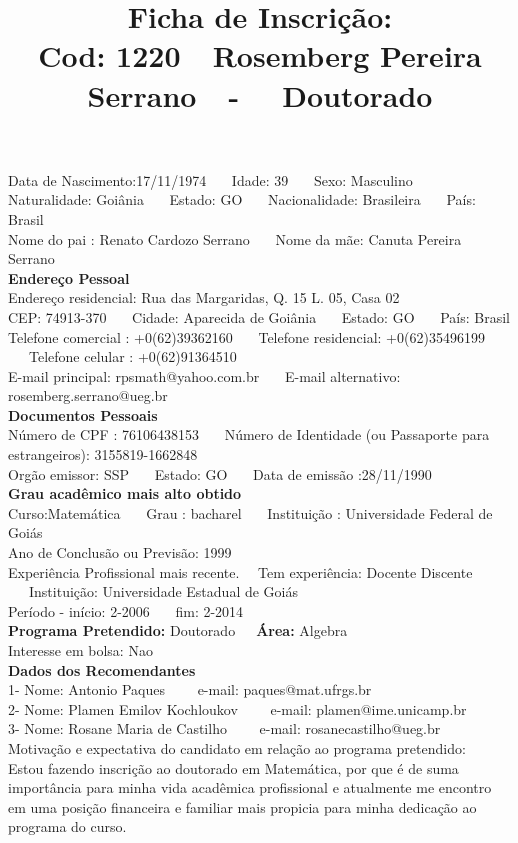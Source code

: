 \documentclass[11pt]{article}
\title{\vspace*{-4cm} Ficha de Inscrição: \\Cod: 1220\ \ Rosemberg Pereira Serrano\ \ - \ \ Doutorado 
 }
\date{}
\begin{document}
\maketitle
\vspace*{-1.5cm}
\noindent Data de Nascimento:17/11/1974
\ \ \ Idade: 39   \ \ \ Sexo: Masculino
\\
Naturalidade: Goiânia  
\ \ \  Estado: GO
\ \ \  Nacionalidade: Brasileira
\ \ \ País: Brasil
\\        
Nome do pai : Renato Cardozo Serrano
\ \ \ Nome da mãe: Canuta Pereira Serrano          
\\[0.2cm]                     
\textbf{Endereço Pessoal} 
\\ 
\noindent Endereço residencial: Rua das Margaridas, Q. 15 L. 05, Casa  02
\\
        CEP: 74913-370 
\ \ \ Cidade: Aparecida de Goiânia 
\ \ \ Estado: GO 
\ \ \ País: Brasil
\\		
		Telefone comercial : +0(62)39362160
\ \ \ Telefone residencial: +0(62)35496199
\ \ \ Telefone celular : +0(62)91364510
\\
E-mail principal: rpsmath@yahoo.com.br
\ \ \ E-mail alternativo: rosemberg.serrano@ueg.br 
\\[0.2cm] 
\textbf{Documentos Pessoais}
\\
\noindent Número de CPF : 76106438153
\ \ \ Número de Identidade (ou Passaporte para estrangeiros): 3155819-1662848
\\
Orgão emissor: SSP
\ \ \ Estado: GO
\ \ \ Data de emissão :28/11/1990
\\[0.3cm]
\textbf{Grau acadêmico mais alto obtido}
\\	
Curso:Matemática
\ \ \ Grau : bacharel
\ \ \ Instituição : Universidade Federal de Goiás
\\			
Ano de Conclusão ou Previsão: 1999
\\ 
Experiência Profissional mais recente. \ \  
Tem experiência: Docente Discente  
\ \ \ Instituição: Universidade Estadual de Goiás
\\  
Período - início: 2-2006
\ \ \ fim: 2-2014
\\[0.2cm] 
\textbf{Programa Pretendido:} Doutorado\ \ \ \textbf{Área:} Algebra\\
Interesse em bolsa: Nao
\\[0.3cm]		
\textbf{Dados dos Recomendantes} 
\\
1- Nome: Antonio Paques
\ \ \ \  e-mail: paques@mat.ufrgs.br 
\\
2- Nome: Plamen Emilov Kochloukov
\ \ \ \ e-mail: plamen@ime.unicamp.br
\\
3- Nome: Rosane Maria de Castilho
\ \ \ \ e-mail: rosanecastilho@ueg.br
\\[0.2cm]
Motivação e expectativa do candidato em relação ao programa pretendido:
\\Estou fazendo inscrição ao doutorado em Matemática, por que é de suma importância para minha vida acadêmica profissional e atualmente me encontro em uma posição financeira e familiar mais propicia para minha dedicação ao programa do curso. 
\end{document}

